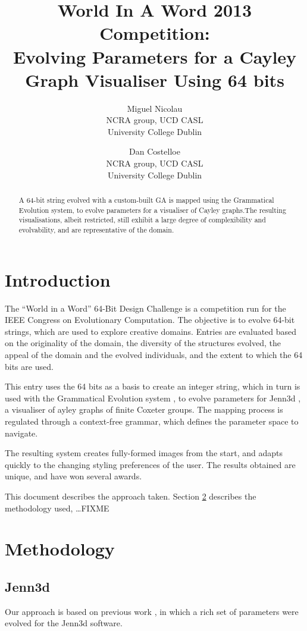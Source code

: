 \documentclass{article}
\title{World In A Word 2013 Competition:\\
Evolving Parameters for a Cayley Graph Visualiser Using 64 bits}
\author{Miguel Nicolau\\
NCRA group, UCD CASL\\
University College Dublin
\and Dan Costelloe\\
NCRA group, UCD CASL\\
University College Dublin}
\date{}
\begin{document}
\maketitle
\begin{abstract}
A 64-bit string evolved with a custom-built GA is mapped using the Grammatical
Evolution system, to evolve parameters for a visualiser of Cayley graphs.The
resulting visualisations, albeit restricted, still exhibit a large degree of
complexibility and evolvability, and are representative of the domain.
\end{abstract}

\section{Introduction}
The ``World in a Word'' 64-Bit Design Challenge is a competition run for the
IEEE Congress on Evolutionary Computation. The objective is to evolve 64-bit
strings, which are used to explore creative domains. Entries are evaluated
based on the originality of the domain, the diversity of the structures
evolved, the appeal of the domain and the evolved individuals, and the extent
to which the 64 bits are used.

This entry uses the 64 bits as a basis to create an integer string, which in
turn is used with the Grammatical Evolution system \cite{oneill03b}, to
evolve parameters for Jenn3d \cite{obermeyer10a}, a visualiser of ayley graphs of
finite Coxeter groups. The mapping process is regulated through a context-free
grammar, which defines the parameter space to navigate.

The resulting system creates fully-formed images from the start, and adapts
quickly to the changing styling preferences of the user. The results obtained
are unique, and have won several awards.

This document describes the approach taken. Section \ref{methodology} describes
the methodology used, \ldots FIXME

\section{Methodology}
\label{methodology}

\subsection{Jenn3d}
Our approach is based on previous work \cite{nicolau2011a}, in which a rich set
of parameters were evolved for the Jenn3d software.
\end{document}
